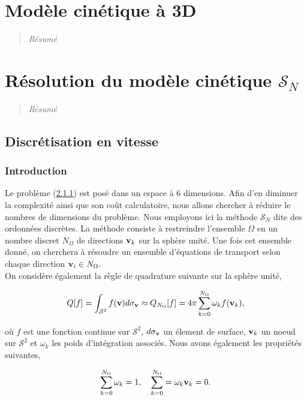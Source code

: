 \chapter{Modèle cinétique à 3D}
\label{chap:ch5}
\begin{quotation}
\textit{Résumé}
\end{quotation}
\minitoc
\newpage
 
 
 
 
\chapter{Résolution du modèle cinétique $\mathcal{S}_N$}
\label{chap:Ch1}
\begin{quotation}
\textit{Résumé}
\end{quotation}
\minitoc
\newpage


\section{Discrétisation en vitesse}
\subsection{Introduction}
Le problème (\ref{}) est posé dans un espace à 6 dimensions. Afin d'en diminuer la complexité ainsi que son coût calculatoire, nous allons chercher à réduire le nombres de dimensions du problème. Nous employons ici la méthode $\mathcal{S}_N$ dite \og des ordonnées discrètes\fg. La méthode consiste à restreindre l'ensemble $\Omega$ en un nombre discret $N_{\Omega}$ de directions $\mathbf{v}_k$  sur la sphère unité. Une fois cet ensemble donné, on cherchera à résoudre un ensemble d'équations de transport selon chaque direction $\mathbf{v}_i \in N_{\Omega}$. \\

On considère également la règle de quadrature suivante sur la sphère unité,

\begin{equation}
\label{eq:quadraS}
Q[f] = \int_{\mathcal{S}^2} f(\mathbf{v}) d \sigma_{\mathbf{v}} \approx Q_{N_{\Omega}}[f] = 4\pi \sum_{k=0}^{N_{\Omega}} \omega_k f(\mathbf{v}_k),
\end{equation}

où $f$ est une fonction continue sur $\mathcal{S}^2$, $d\sigma_{\mathbf{v}}$ un élement de surface, $\mathbf{v}_k$ un noeud sur $\mathcal{S}^2$ et $\omega_k$ les poids d'intégration associés. Nous avons également les propriétés suivantes, 

\begin{equation}
\label{eq:poids}
\sum_{k=0}^{N_{\Omega}} \omega_k = 1, \quad \sum_{k=0}^{N_{\Omega}} = \omega_k \mathbf{v}_k = 0.
\end{equation}

